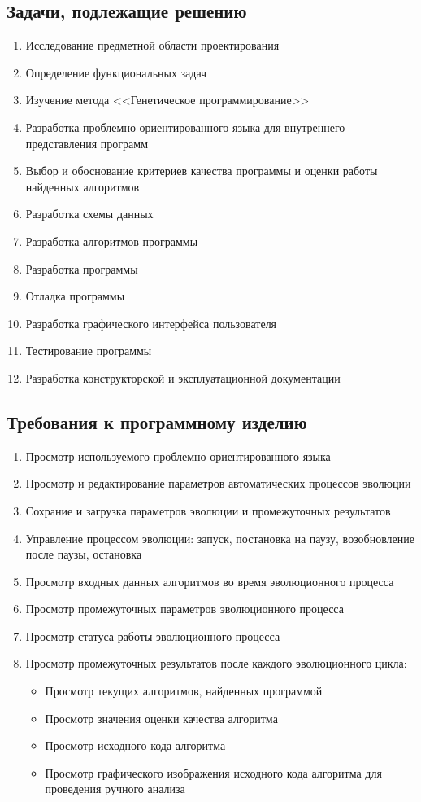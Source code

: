 \documentclass[russian,utf8,emptystyle]{eskdtext}
\begin{document}
\subsection{Задачи, подлежащие решению}
\begin{enumerate}
\item Исследование предметной области проектирования
\item Определение функциональных задач
\item Изучение метода <<Генетическое программирование>>
\item Разработка проблемно-ориентированного языка для внутреннего представления программ
\item Выбор и обоснование критериев качества программы и оценки работы найденных алгоритмов
\item Разработка схемы данных
\item Разработка алгоритмов программы
\item Разработка программы
\item Отладка программы
\item Разработка графического интерфейса пользователя
\item Тестирование программы
\item Разработка конструкторской и эксплуатационной документации
\end{enumerate}

\subsection{Требования к программному изделию}
\begin{enumerate}
\item Просмотр используемого проблемно-ориентированного языка
\item Просмотр и редактирование параметров автоматических процессов эволюции
\item Сохрание и загрузка параметров эволюции и промежуточных результатов
\item Управление процессом эволюции: запуск, постановка на паузу, возобновление после паузы, остановка
\item Просмотр входных данных алгоритмов во время эволюционного процесса
\item Просмотр промежуточных параметров эволюционного процесса
\item Просмотр статуса работы эволюционного процесса
\item Просмотр промежуточных результатов после каждого эволюционного цикла:
\begin{itemize}
\item Просмотр текущих алгоритмов, найденных программой
\item Просмотр значения оценки качества алгоритма
\item Просмотр исходного кода алгоритма
\item Просмотр графического изображения исходного кода алгоритма для проведения ручного анализа
\end{itemize}
\end{enumerate}
\end{document}
